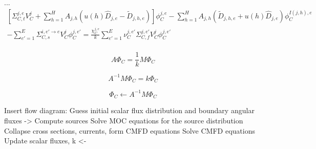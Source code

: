 ...
\begin{equation}
	\begin{split}
		\left[\Sigma_{C,t}^{j,e} V_C^j + \sum_{h=1}^H A_{j,h} \left(u(h) \hat{D}_{j,e} - \tilde{D}_{j,h,e} \right) \right] \phi_C^{j,e} - \sum_{h=1}^H A_{j,h} \left( \tilde{D}_{j,h,e} + u(h) \hat{D}_{j,e} \right) \phi_C^{I(j,h),e} & \\ - \sum_{e'=1}^E  \Sigma_{C,s}^{i, e' \rightarrow e} V_C^j \phi_C^{j,e'} =
		\frac{\chi_C^{j,e}}{k} \sum_{e'=1}^{E} \nu_C^{j, e'} \Sigma_{C,f}^{j,e'} V_C^j \phi_C^{j,e'} & \\
	\end{split}
\end{equation}


\begin{equation}
	A \Phi_C = \frac{1}{k} M \Phi_C
\end{equation}


\begin{equation}
	A^{-1} M \Phi_C = k \Phi_C
\end{equation}

\begin{equation}
	\Phi_C \leftarrow A^{-1} M \Phi_C
\end{equation}


Insert flow diagram:
Guess initial scalar flux distribution and boundary angular fluxes
->
Compute sources
Solve MOC equations for the source distribution
Collapse cross sections, currents, form CMFD equations
Solve CMFD equations
Update scalar fluxes, k
<-